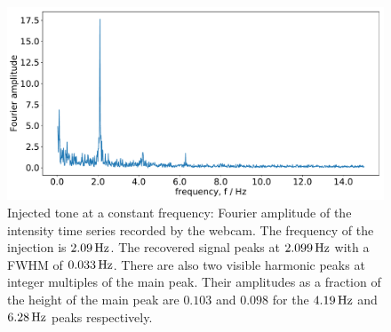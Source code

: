 \documentclass[paper-main.tex]{subfiles}
\begin{document}




\begin{figure}
	\includegraphics[width=.49\textwidth]{figures/webcam_expt_4_0209-cropped.pdf}
	\caption{\label{fig:webcam_spectrum}
Injected tone at a constant frequency: Fourier amplitude of the intensity time series recorded by the webcam. 
The frequency of the injection is $2.09\,{\rm Hz}$. 
The recovered signal peaks at $2.099\,{\rm Hz}$ with a FWHM of $0.033\,{\rm Hz}$. 
There are also two visible harmonic peaks at integer multiples of the main peak. 
Their amplitudes as a fraction of the height of the main peak are  $0.103$ and $0.098$ for the $4.19\,{\rm Hz}$ and $6.28\,{\rm Hz}$ peaks respectively. 
}
	
\end{figure}
\end{document}
